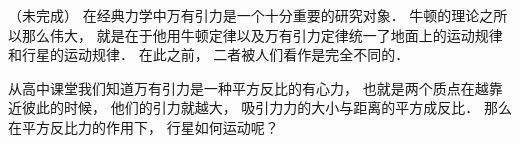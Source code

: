
（未完成）
在经典力学中万有引力是一个十分重要的研究对象． 牛顿的理论之所以那么伟大， 就是在于他用牛顿定律以及万有引力定律统一了地面上的运动规律和行星的运动规律． 在此之前， 二者被人们看作是完全不同的．

从高中课堂我们知道万有引力是一种平方反比的有心力， 也就是两个质点在越靠近彼此的时候， 他们的引力就越大， 吸引力力的大小与距离的平方成反比． 那么在平方反比力的作用下， 行星如何运动呢？

